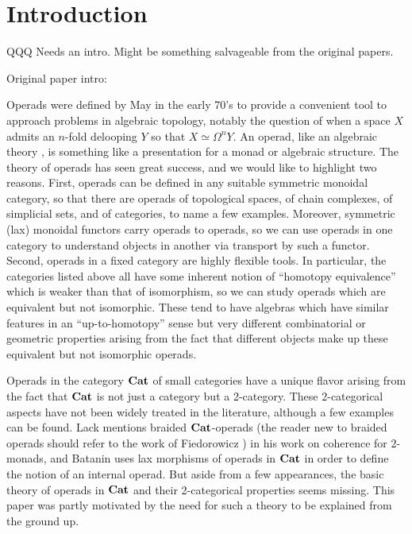 \section{Introduction}
QQQ Needs an intro. Might be something salvageable from the original papers.

Original paper intro:

Operads were defined by May \cite{maygeom} in the early 70's to provide a convenient tool to approach problems in algebraic topology, notably the question of when a space $X$ admits an $n$-fold delooping $Y$ so that $X \simeq \Omega^{n}Y$.  An operad, like an algebraic theory \cite{lawvere-thesis}, is something like a presentation for a monad or algebraic structure.  The theory of operads has seen great success, and we would like to highlight two reasons.  First, operads can be defined in any suitable symmetric monoidal category, so that there are operads of topological spaces, of chain complexes, of simplicial sets, and of categories, to name a few examples.  Moreover, symmetric (lax) monoidal functors carry operads to operads, so we can use operads in one category to understand objects in another via transport by such a functor.  Second, operads in a fixed category are highly flexible tools.  In particular, the categories listed above all have some inherent notion of ``homotopy equivalence'' which is weaker than that of isomorphism, so we can study operads which are equivalent but not isomorphic.  These tend to have algebras which have similar features in an ``up-to-homotopy'' sense but very different combinatorial or geometric properties arising from the fact that different objects make up these equivalent but not isomorphic operads.

Operads in the category $\mathbf{Cat}$ of small categories have a unique flavor arising from the fact that $\mathbf{Cat}$ is not just a category but a 2-category.  These 2-categorical aspects have not been widely treated in the literature, although a few examples can be found.  Lack \cite{lack-cod} mentions braided $\mathbf{Cat}$-operads (the reader new to braided operads should refer to the work of Fiedorowicz \cite{fie-br}) in his work on coherence for $2$-monads, and Batanin \cite{bat-eh} uses lax morphisms of operads in $\mathbf{Cat}$ in order to define the notion of an internal operad.  But aside from a few appearances, the basic theory of operads in $\mathbf{Cat}$ and their 2-categorical properties seems missing.  This paper was partly motivated by the need for such a theory to be explained from the ground up.

